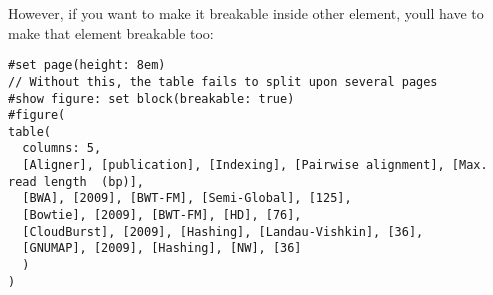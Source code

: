However, if you want to make it breakable inside other element,
you\textquotesingle ll have to make that element breakable too:

\begin{verbatim}
#set page(height: 8em)
// Without this, the table fails to split upon several pages
#show figure: set block(breakable: true)
#figure(
table(
  columns: 5,
  [Aligner], [publication], [Indexing], [Pairwise alignment], [Max. read length  (bp)],
  [BWA], [2009], [BWT-FM], [Semi-Global], [125],
  [Bowtie], [2009], [BWT-FM], [HD], [76],
  [CloudBurst], [2009], [Hashing], [Landau-Vishkin], [36],
  [GNUMAP], [2009], [Hashing], [NW], [36]
  )
)
\end{verbatim}

\pandocbounded{}

\pandocbounded{}
